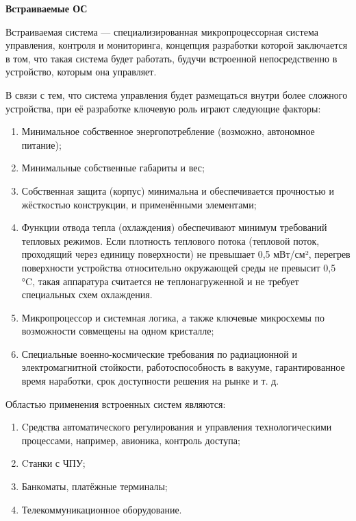   \begin{center}{\bfseries Встраиваемые ОС}
  \end{center}

  \begin{opr}
    Встраиваемая система — специализированная микропроцессорная система управления, контроля и мониторинга, концепция разработки которой заключается в том, что такая система будет работать, будучи встроенной непосредственно в устройство, которым она управляет.
  \end{opr}

  \begin{utv}
    В связи с тем, что система управления будет размещаться внутри более сложного устройства, при её разработке ключевую роль играют следующие факторы:
    \begin{enumerate}
      \item Минимальное собственное энергопотребление (возможно, автономное питание);
      \item Минимальные собственные габариты и вес;
      \item Собственная защита (корпус) минимальна и обеспечивается прочностью и жёсткостью конструкции, и применёнными элементами;
      \item Функции отвода тепла (охлаждения) обеспечивают минимум требований тепловых режимов. Если плотность теплового потока (тепловой поток, проходящий через единицу поверхности) не превышает 0,5 мВт/см², перегрев поверхности устройства относительно окружающей среды не превысит 0,5 °C, такая аппаратура считается не теплонагруженной и не требует специальных схем охлаждения.
      \item Микропроцессор и системная логика, а также ключевые микросхемы по возможности совмещены на одном кристалле;
      \item Специальные военно-космические требования по радиационной и электромагнитной стойкости, работоспособность в вакууме, гарантированное время наработки, срок доступности решения на рынке и т. д.
    \end{enumerate}
  \end{utv}

  \begin{utv}
    Областью применения встроенных систем являются:
    \begin{enumerate}
      \item Cредства автоматического регулирования и управления технологическими процессами, например, авионика, контроль доступа;
      \item Cтанки с ЧПУ;
      \item Банкоматы, платёжные терминалы;
      \item Телекоммуникационное оборудование.
    \end{enumerate}
  \end{utv}

